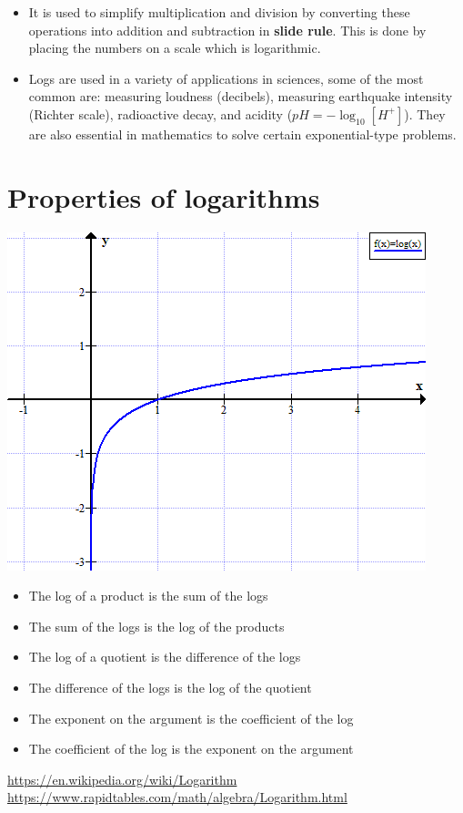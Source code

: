 \documentclass[a4paper, 11pt]{article}
\begin{document}
    \begin{itemize}[noitemsep]
      \item It is used to simplify multiplication and division by converting these operations into addition and subtraction in \textbf{slide rule}. This is done by placing the numbers on a scale which is logarithmic. \cite{wiki}
      \item Logs are used in a variety of applications in sciences, some of the most common are: measuring loudness (decibels), measuring earthquake intensity (Richter scale), radioactive decay, and acidity ($pH= -\log_{10} [H^+]$). They are also essential in mathematics to solve certain exponential-type problems.
    \end{itemize}


\section{Properties of logarithms}
    \begin{minipage}{0.25\textwidth}
    \includegraphics[width=\textwidth, height= 2.5 cm]{log_graph.png}
    \end{minipage}
    \begin{minipage}{0.9\textwidth}
    \begin{itemize}[noitemsep]
      \item The log of a product is the sum of the logs
      \item The sum of the logs is the log of the products
      \item The log of a quotient is the difference of the logs
      \item The difference of the logs is the log of the quotient
      \item The exponent on the argument is the coefficient of the log
      \item The coefficient of the log is the exponent on the argument
    \end{itemize}
    \end{minipage}

 
    
\begin{thebibliography}{9}
\url{https://en.wikipedia.org/wiki/Logarithm}
\url{https://www.rapidtables.com/math/algebra/Logarithm.html}
\end{thebibliography}
\end{document}
